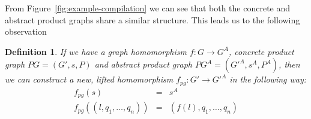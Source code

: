 \documentclass{sig-alternate-10pt}
\renewcommand{\path}[2]{ #1 \mapsto \ensuremath{#2} }
\newtheorem{defn}{Definition}
\begin{document}
From Figure~\ref{fig:example-compilation} we can see that both the concrete and abstract product graphs share a similar structure. This leads us to the following observation 

\begin{defn}
If we have a graph homomorphism $f : G \rightarrow G^A$, concrete product graph $PG = (G',s,P)$ and abstract product graph $PG^A = (G'^A, s^A, P^A)$, then we can construct a new, lifted homomorphism $f_{pg} : G' \rightarrow G'^A$ in the following way: 
\[ \begin{array}{rcl}
  f_{pg}( s ) & = & s^A  \\
  f_{pg}( (l,q_1,\ldots,q_n) ) & = & (f(l),q_1,\ldots,q_n) \\
\end{array} \]
\end{defn}

\newcommand{\state}[4]{\node[state,#3](#1)[#4]{#2};}
\newcommand{\transition}[4]{\path[->] (#1) edge [#4] node {#3} (#2);}
\end{document}
